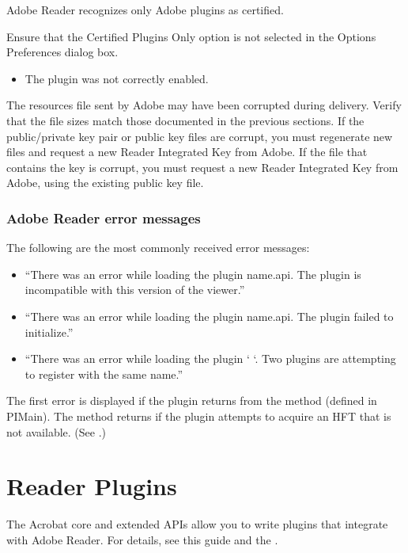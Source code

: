 \documentclass[letterpaper,12pt,english,openany,oneside]{sphinxmanual}
\begin{document}
Adobe Reader recognizes only Adobe plugins as certified.

Ensure that the Certified Plugins Only option is not selected in the Options Preferences dialog box.
\begin{itemize}
\item {} 
The plugin was not correctly enabled.

\end{itemize}

The resources file sent by Adobe may have been corrupted during delivery. Verify that the file sizes match those documented in the previous sections. If the public/private key pair or public key files are corrupt, you must regenerate new files and request a new Reader Integrated Key from Adobe. If the file that contains the key is corrupt, you must request a new Reader Integrated Key from Adobe, using the existing public key file.


\subsection{Adobe Reader error messages}
\label{\detokenize{Plugins_ReaderPlug:adobe-reader-error-messages}}
The following are the most commonly received error messages:
\begin{itemize}
\item {} 
“There was an error while loading the plugin name.api. The plugin is incompatible with this version of the viewer.”

\item {} 
“There was an error while loading the plugin name.api. The plugin failed to initialize.”

\item {} 
“There was an error while loading the plugin ‘  ‘. Two plugins are attempting to register with the same name.”

\end{itemize}

The first error is displayed if the plugin returns  from the  method (defined in PIMain). The method returns  if the plugin attempts to acquire an HFT that is not available. (See .)


\chapter{Reader Plugins}
\label{\detokenize{Reader_Plugins:reader-plugins}}\label{\detokenize{Reader_Plugins::doc}}
The Acrobat core and extended APIs allow you to write plugins that integrate with Adobe Reader. For details, see this guide and the .
\end{document}
